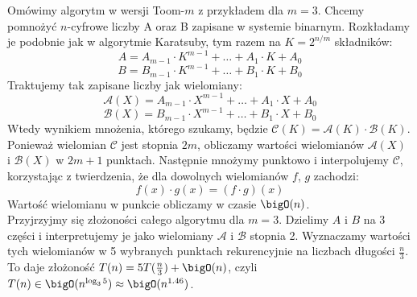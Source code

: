 Omówimy algorytm w wersji Toom-\(m\) z przykładem dla \( m = 3 \). Chcemy pomnożyć \(n\)-cyfrowe liczby A oraz B zapisane w systemie binarnym.
Rozkładamy je podobnie jak w algorytmie Karatsuby, tym razem na \( K = 2^{n / m} \) składników:
\[
    A = A_{m-1} \cdot K^{m-1} + \dots + A_1 \cdot K + A_0
\]
\[
    B = B_{m-1} \cdot K^{m-1} + \dots + B_1 \cdot K + B_0
\]
Traktujemy tak zapisane liczby jak wielomiany:
\[
    \mathcal{A}(X) = A_{m-1} \cdot X^{m-1} + \dots + A_1 \cdot X + A_0
\]
\[
    \mathcal{B}(X) = B_{m-1} \cdot X^{m-1} + \dots + B_1 \cdot X + B_0
\]
Wtedy wynikiem mnożenia, którego szukamy, będzie \( \mathcal{C}(K) = \mathcal{A}(K) \cdot \mathcal{B}(K) \). Ponieważ wielomian \( \mathcal{C} \) jest stopnia \( 2m \), obliczamy wartości wielomianów \( \mathcal{A}(X) \) i \( \mathcal{B}(X) \) w \( 2m+1 \) punktach.
Następnie mnożymy punktowo i interpolujemy \( \mathcal{C} \), korzystając z twierdzenia, że dla dowolnych wielomianów \( f \), \( g \) zachodzi:
\[
    f(x) \cdot g(x) = (f \cdot g)(x)
\]
Wartość wielomianu w punkcie obliczamy w czasie \( \bigO(n) \). \\
Przyjrzyjmy się złożoności całego algorytmu dla \( m = 3 \). Dzielimy \( A \) i \( B \) na 3 części i interpretujemy je jako wielomiany \( \mathcal{A} \) i \( \mathcal{B} \) stopnia 2. Wyznaczamy wartości tych wielomianów w 5 wybranych punktach rekurencyjnie na liczbach długości \( \frac{n}{3} \). To daje złożoność \( T(n) = 5T(\frac{n}{3}) + \bigO(n) \), czyli \( T(n) \in \bigO(n^{\log_3 5}) \approx \bigO(n^{1.46}) \).


